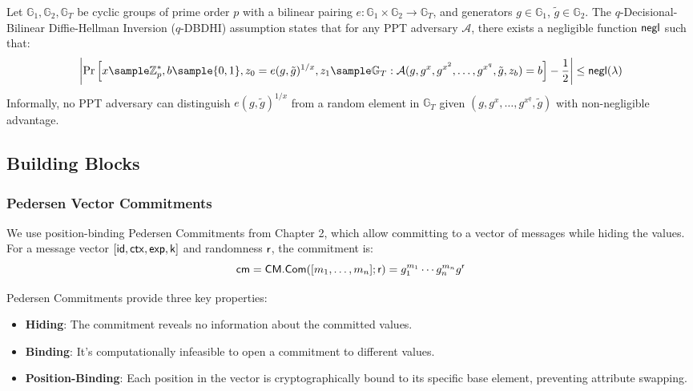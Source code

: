 
\begin{definition}
Let $\mathbb{G}_1, \mathbb{G}_2, \mathbb{G}_T$ be cyclic groups of prime order $p$ with a bilinear pairing $e: \mathbb{G}_1 \times \mathbb{G}_2 \to \mathbb{G}_T$, and generators $g \in \mathbb{G}_1$, $\tilde{g} \in \mathbb{G}_2$. The $q$-Decisional-Bilinear Diffie-Hellman Inversion ($q$-DBDHI) assumption states that for any PPT adversary $\mathcal{A}$, there exists a negligible function $\mathsf{negl}$ such that:
\[
\left| \Pr\left[ x \sample \Z_p^*, b \sample \{0,1\}, z_0 = e(g, \tilde{g})^{1/x}, z_1 \sample \G_T : \mathcal{A}(g, g^x, g^{x^2}, \ldots, g^{x^q}, \tilde{g}, z_b) = b \right] - \frac{1}{2}\right| \leq \negl(\lambda)
\]
Informally, no PPT adversary can distinguish $e(g, \tilde{g})^{1/x}$ from a random element in $\mathbb{G}_T$ given $(g, g^x, \ldots, g^{x^q}, \tilde{g})$ with non-negligible advantage.
\end{definition}


\subsection{Building Blocks}

\subsubsection{Pedersen Vector Commitments}
We use position-binding Pedersen Commitments from Chapter 2, which allow committing to a vector of messages while hiding the values. For a message vector $[\mathsf{id}, \mathsf{ctx}, \mathsf{exp}, \mathsf{k}]$ and randomness $\mathsf{r}$, the commitment is:
\[
\mathsf{cm} = \mathsf{CM.Com}([m_1, \ldots, m_n];\mathsf{r}) = g_1^{m_1} \cdots g_n^{m_n} g^{\mathsf{r}}
\]

Pedersen Commitments provide three key properties:
\begin{itemize}
    \item \textbf{Hiding}: The commitment reveals no information about the committed values.
    \item \textbf{Binding}: It's computationally infeasible to open a commitment to different values.
    \item \textbf{Position-Binding}: Each position in the vector is cryptographically bound to its specific base element, preventing attribute swapping.
\end{itemize}


